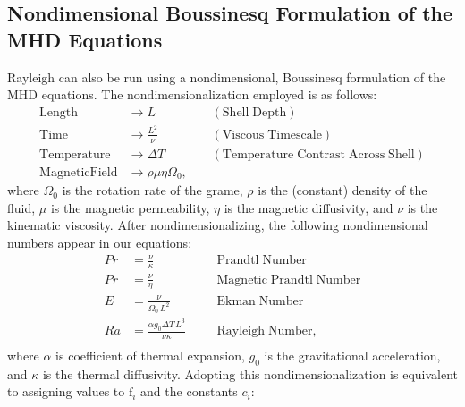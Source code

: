 \documentclass[10pt, letterpaper]{article}
\newcommand{\ff}{\mathrm{f}}
\begin{document}
\subsection{Nondimensional Boussinesq Formulation of the MHD Equations}
Rayleigh can also be run using a nondimensional, Boussinesq formulation of the MHD equations.  The nondimensionalization employed is as follows: 
\begin{align*}
\mathrm{Length} &\rightarrow L &\;\;\;\; \mathrm{(Shell\; Depth)} \\
\mathrm{Time} &\rightarrow   \frac{L^2}{\nu} &\;\;\;\; \mathrm{(Viscous\; Timescale)}\\
\mathrm{Temperature} &\rightarrow \Delta T&\;\;\;\; \mathrm{(Temperature\; Contrast\; Across\; Shell)} \\
\mathrm{Magnetic Field} &\rightarrow \rho\mu\eta\Omega_0,
\end{align*}
where $\Omega_0$ is the rotation rate of the grame, $\rho$ is the (constant) density of the fluid, $\mu$ is the magnetic permeability, $\eta$ is the magnetic diffusivity, and $\nu$ is the kinematic viscosity.  After nondimensionalizing, the following nondimensional numbers appear in our equations:
\begin{align*}
Pr &=\frac{\nu}{\kappa}                          &\;\;\;\;\;\; \mathrm{Prandtl\; Number} \\
Pr &=\frac{\nu}{\eta}                            &\;\;\;\;\;\; \mathrm{Magnetic\; Prandtl\; Number} \\
E  &=\frac{\nu}{\Omega_0\,L^2}                   &\;\;\;\;\;\; \mathrm{Ekman\; Number} \\
Ra &=\frac{\alpha g_0 \Delta T\,L^3}{\nu\kappa}  &\;\;\;\;\;\; \mathrm{Rayleigh\; Number}, \\
\end{align*}
where $\alpha$ is coefficient of thermal expansion, $g_0$ is the gravitational acceleration, and $\kappa$ is the thermal diffusivity.  Adopting this nondimensionalization is equivalent to assigning values to $\ff_i$ and the constants $c_i$:
\end{document}
